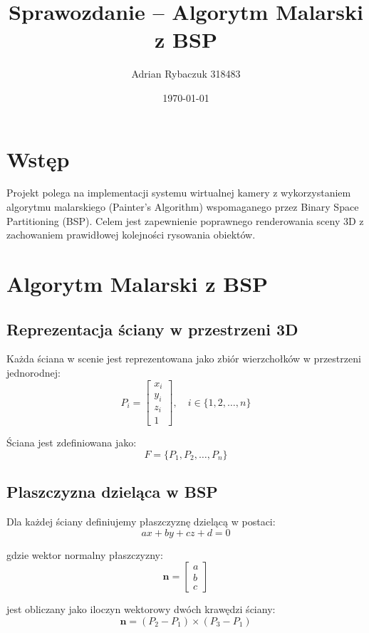 \documentclass[a4paper,12pt]{article}
\title{Sprawozdanie – Algorytm Malarski z BSP}
\author{Adrian Rybaczuk 318483}
\date{\today}
\begin{document}
\maketitle
\tableofcontents
\newpage

\section{Wstęp}

Projekt polega na implementacji systemu wirtualnej kamery z wykorzystaniem algorytmu malarskiego (Painter's Algorithm) wspomaganego przez Binary Space Partitioning (BSP). Celem jest zapewnienie poprawnego renderowania sceny 3D z zachowaniem prawidłowej kolejności rysowania obiektów.

\section{Algorytm Malarski z BSP}

\subsection{Reprezentacja ściany w przestrzeni 3D}

Każda ściana w scenie jest reprezentowana jako zbiór wierzchołków w przestrzeni jednorodnej:
\[
P_i = \begin{bmatrix} x_i \\ y_i \\ z_i \\ 1 \end{bmatrix}, \quad i \in \{1,2,\ldots,n\}
\]

Ściana jest zdefiniowana jako:
\[
F = \{P_1, P_2, \ldots, P_n\}
\]

\subsection{Plaszczyzna dzieląca w BSP}

Dla każdej ściany definiujemy płaszczyznę dzielącą w postaci:
\[
ax + by + cz + d = 0
\]

gdzie wektor normalny płaszczyzny:
\[
\mathbf{n} = \begin{bmatrix} a \\ b \\ c \end{bmatrix}
\]

jest obliczany jako iloczyn wektorowy dwóch krawędzi ściany:
\[
\mathbf{n} = (P_2 - P_1) \times (P_3 - P_1)
\]
\end{document}
